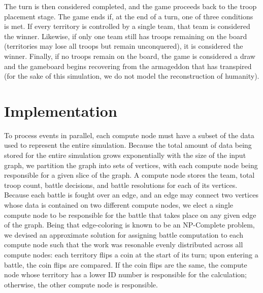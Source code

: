 \documentclass[10pt]{article}
\begin{document}
\begin{multicols}{2}
		The turn is then considered completed, and the game proceeds back to the troop placement stage.
		The game ends if, at the end of a turn, one of three conditions is met. 
		If every territory is controlled by a single team, that team is considered the winner. 
		Likewise, if only one team still has troops remaining on the board (territories may lose all troops but remain unconquered), it is considered the winner.
		Finally, if no troops remain on the board, the game is considered a draw and the gameboard begins recovering from the armageddon that has transpired (for the sake of this simulation, we do not model the reconstruction of humanity).

		\section*{Implementation}
		To process events in parallel, each compute node must have a subset of the data used to represent the entire simulation.  
		Because the total amount of data being stored for the entire simulation grows exponentially with the size of the input graph, we partition the graph into sets of vertices, with each compute node being responsible for a given slice of the graph.  
		A compute node stores the team, total troop count, battle decisions, and battle resolutions for each of its vertices.
		Because each battle is fought over an edge, and an edge may connect two vertices whose data is contained on two different compute nodes, we elect a single compute node to be responsible for the battle that takes place on any given edge of the graph.
		Being that edge-coloring is known to be an NP-Complete problem, we devised an approximate solution for assigning battle computation to each compute node such that the work was resonable evenly distributed across all compute nodes: each territory flips a coin at the start of its turn; upon entering a battle, the coin flips are compared.  
		If the coin flips are the same, the compute node whose territory has a lower ID number is responsible for the calculation; otherwise, the other compute node is responsible.


\end{multicols}
\end{document}
